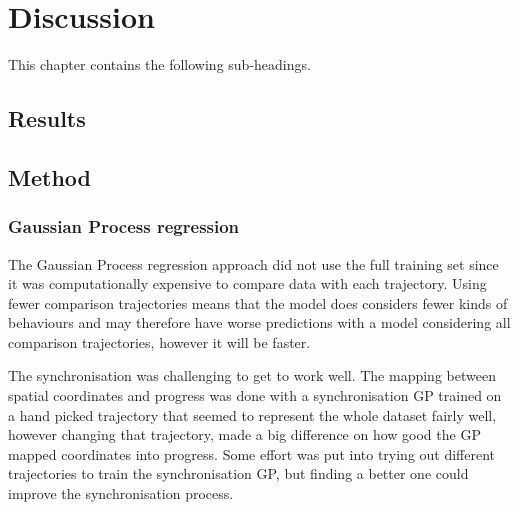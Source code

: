 
\chapter{Discussion}
\label{cha:discussion}

This chapter contains the following sub-headings.

\section{Results}
\label{sec:discussion-results}


\section{Method}
\label{sec:discussion-method}

\subsection{Gaussian Process regression}
The Gaussian Process regression approach did not use the full training set since it was computationally expensive to compare data with each trajectory. Using fewer comparison trajectories means that the model does considers fewer kinds of behaviours and may therefore have worse predictions with a model considering all comparison trajectories, however it will be faster.

The synchronisation was challenging to get to work well. The mapping between spatial coordinates and progress was done with a synchronisation GP trained on a hand picked trajectory that seemed to represent the whole dataset fairly well, however changing that trajectory, made a big difference on how good the GP mapped coordinates into progress. Some effort was put into trying out different trajectories to train the synchronisation GP, but finding a better one could improve the synchronisation process.

